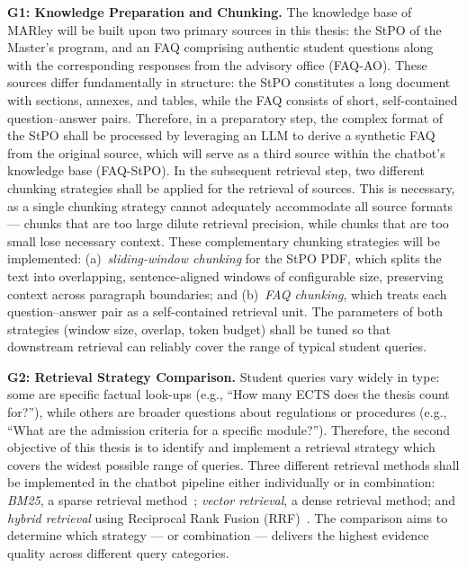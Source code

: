 \documentclass[10pt,twocolumn]{article}
\begin{document}
\medskip
\noindent\textbf{G1: Knowledge Preparation and Chunking.}
The knowledge base of MARley will be built upon two primary sources in this thesis: the StPO of the Master's program, and an FAQ comprising authentic student questions along with the corresponding responses from the advisory office (FAQ-AO). These sources differ fundamentally in structure: the StPO constitutes a long document with sections, annexes, and tables, while the FAQ consists of short, self-contained question--answer pairs. Therefore, in a preparatory step, the complex format of the StPO shall be processed by leveraging an LLM to derive a synthetic FAQ from the original source, which will serve as a third source within the chatbot's knowledge base (FAQ-StPO). In the subsequent retrieval step, two different chunking strategies shall be applied for the retrieval of sources. This is necessary, as a single chunking strategy cannot adequately accommodate all source formats --- chunks that are too large dilute retrieval precision, while chunks that are too small lose necessary context. These complementary chunking strategies will be implemented: (a)~\emph{sliding-window chunking} for the StPO PDF, which splits the text into overlapping, sentence-aligned windows of configurable size, preserving context across paragraph boundaries; and (b)~\emph{FAQ chunking}, which treats each question--answer pair as a self-contained retrieval unit. The parameters of both strategies (window size, overlap, token budget) shall be tuned so that downstream retrieval can reliably cover the range of typical student queries.

\medskip
\noindent\textbf{G2: Retrieval Strategy Comparison.}
Student queries vary widely in type: some are specific factual look-ups (e.g., ``How many ECTS does the thesis count for?''), while others are broader questions about regulations or procedures (e.g., ``What are the admission criteria for a specific module?''). Therefore, the second objective of this thesis is to identify and implement a retrieval strategy which covers the widest possible range of queries. Three different retrieval methods shall be implemented in the chatbot pipeline either individually or in combination: \emph{BM25}, a sparse retrieval method~\cite{robertson2009bm25}; \emph{vector retrieval}, a dense retrieval method; and \emph{hybrid retrieval} using Reciprocal Rank Fusion (RRF)~\cite{cormack2009rrf}. The comparison aims to determine which strategy --- or combination --- delivers the highest evidence quality across different query categories.
\end{document}
